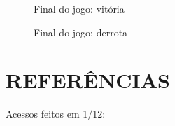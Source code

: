 \documentclass[rel_mlp]{iiufrgs}
\begin{document}
\begin{figure}[htb]
    \centering
    \caption{Final do jogo: vitória}
    \label{fig:figura1}
\end{figure}

\begin{figure}[htb]
    \centering
    \caption{Final do jogo: derrota}
    \label{fig:figura1}
\end{figure}

%
\chapter{REFERÊNCIAS}

Acessos feitos em 1/12:
\end{document}
